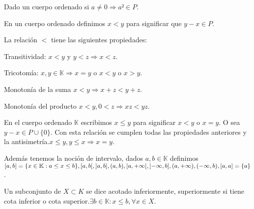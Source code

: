 \begin{prop}
    Dado un cuerpo ordenado si \(a \neq 0 \Rightarrow a²\in P\).
\end{prop}

En un cuerpo ordenado definimos \(x<y\) para significar que \(y-x\in P\).

La relación \(<\) tiene las siguientes propiedades:

\begin{prop}
    Transitividad: \(x<y\) y \(y<z \Rightarrow x<z\).
\end{prop}

\begin{prop}
    Tricotomía: \(x,y \in \mathbb{K} \Rightarrow x=y\) o \(x<y\) o \(x>y\).
\end{prop}

\begin{prop}
    Monotonía de la suma \(x<y \Rightarrow x+z<y+z\).
\end{prop}

\begin{prop}
    Monotonía del producto \(x<y, 0<z \Rightarrow xz <yz\).
\end{prop}

En el cuerpo ordenado \(\mathbb{K} \) escribimos \(x \leq y\) para significar \(x<y\) o \(x=y\). O sea \(y-x \in P \cup \{0\} \). Con esta relación se cumplen todas las propiedades anteriores y la antisimetría.\(x \leq y, y \leq x \Rightarrow x = y\).

Además tenemos la noción de intervalo, dados \(a,b \in \mathbb{K} \) definimos \([a,b ] = \{ x \in \mathbb{K} : a \leq x \leq b \}, \interval[open right]{a}{b}, \interval[open left]{a}{b}, (a,b), \interval[open right]{a}{+\infty},
\interval[open left]{-\infty}{b}, (a, +\infty), (-\infty, b), [a, a] = \{a\} \).

Un subconjunto de \(X \subset K\) se dice acotado inferiormente, superiormente si tiene cota inferior o cota superior.\(\exists b \in \mathbb{K}: x \leq b, \forall x \in X\).
